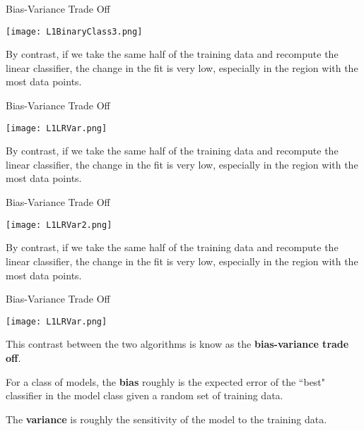 \documentclass[10pt,handout]{beamer}
\begin{document}
\begin{frame}[fragile]{Bias-Variance Trade Off}
  \begin{minipage}[t][0.5\textheight][t]{\textwidth}
    \centering
     \texttt{[image: L1BinaryClass3.png]}
  \end{minipage}
  \vfill
  \begin{minipage}[t][0.5\textheight][t]{\textwidth}
By contrast, if we take the same half of the training data and recompute the linear classifier, the change in the fit is very low, especially in the region with the most data points. 
 \end{minipage}
\end{frame}


\begin{frame}[fragile]{Bias-Variance Trade Off}
  \begin{minipage}[t][0.5\textheight][t]{\textwidth}
    \centering
     \texttt{[image: L1LRVar.png]}
  \end{minipage}
  \vfill
  \begin{minipage}[t][0.5\textheight][t]{\textwidth}
By contrast, if we take the same half of the training data and recompute the linear classifier, the change in the fit is very low, especially in the region with the most data points. 
 \end{minipage}
\end{frame}


\begin{frame}[fragile]{Bias-Variance Trade Off}
  \begin{minipage}[t][0.5\textheight][t]{\textwidth}
    \centering
     \texttt{[image: L1LRVar2.png]}
  \end{minipage}
  \vfill
  \begin{minipage}[t][0.5\textheight][t]{\textwidth}
By contrast, if we take the same half of the training data and recompute the linear classifier, the change in the fit is very low, especially in the region with the most data points. 
 \end{minipage}
\end{frame}




\begin{frame}[fragile]{Bias-Variance Trade Off}
  \begin{minipage}[t][0.5\textheight][t]{\textwidth}
    \centering
     \texttt{[image: L1LRVar.png]}
  \end{minipage}
  \vfill
  \begin{minipage}[t][0.5\textheight][t]{\textwidth}
This contrast between the two algorithms is know as the \textbf{bias-variance trade off}. \pause

For a class of models, the \textbf{bias} roughly is the expected error of the ``best" classifier in the model class given a random set of training data.\pause

The \textbf{variance} is roughly the sensitivity of the model to the training data. 
 \end{minipage}
\end{frame}
\end{document}

